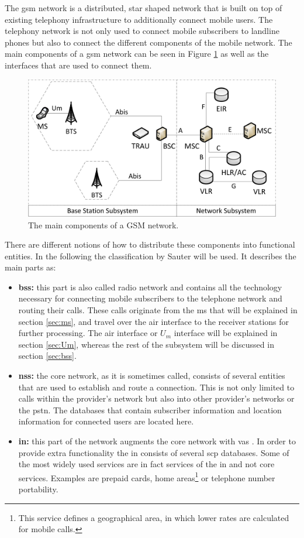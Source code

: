 The \gls{gsm} network is a distributed, star shaped network that is built on top of existing telephony infrastructure to additionally connect mobile users.
The telephony network is not only used to connect mobile subscribers to landline phones but also to connect the different components of the mobile network.
The main components of a \gls{gsm} network can be seen in Figure \ref{fig:gsm_network} as well as the interfaces that are used to connect them.
\begin{figure}
\centering
\includegraphics{../Images/Architecture}
\caption{The main components of a GSM network.}
\label{fig:gsm_network}
\end{figure}
There are different notions of how to distribute these components into functional entities.
In the following the classification by Sauter \cite{kommsys2006} will be used.
It describes the main parts as:
\begin{itemize}
	\item \textbf{\gls{bss}:} this part is also called radio network and contains all the technology necessary for connecting mobile subscribers to the telephone network and routing their calls. 
	These calls originate from the \gls{ms} that will be explained in section \ref{sec:ms}, and travel over the air interface to the receiver stations for further processing.
	The air interface or $U_m$ interface will be explained in section \ref{sec:Um}, whereas the rest of the subsystem will be discussed in section \ref{sec:bss}.
	\item \textbf{\gls{nss}:} the core network, as it is sometimes called, consists of several entities that are used to establish and route a connection.
	This is not only limited to calls within the provider's network but also into other provider's networks or the \gls{pstn}.
	The databases that contain subscriber information and location information for connected users are located here.
	\item \textbf{\gls{in}:} this part of the network augments the core network with \gls{vas} \cite{ITU1200}.
	In order to provide extra functionality the \gls{in} consists of several \gls{scp} databases.
	Some of the most widely used services are in fact services of the \gls{in} and not core services.
	Examples are prepaid cards, home areas\footnote{This service defines a geographical area, in which lower rates are calculated for mobile calls.} or telephone number portability.
\end{itemize}
